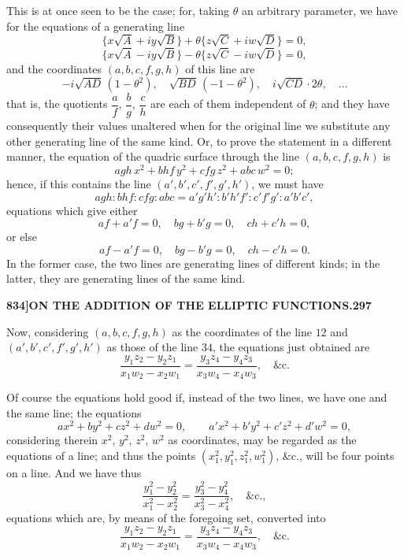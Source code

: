 \documentclass[11pt]{article}
\begin{document}
This is at once seen to be the case; for, taking $\theta$ an arbitrary parameter, we have for the equations of a generating line
\[
\{x\sqrt{A} + iy\sqrt{B}\} + \theta\{z\sqrt{C} + iw\sqrt{D}\} = 0,
\]
\[
\{x\sqrt{A} - iy\sqrt{B}\} - \theta\{z\sqrt{C} - iw\sqrt{D}\} = 0,
\]
and the coordinates $(a, b, c, f, g, h)$ of this line are
\[
-i\sqrt{AD}\,(1 - \theta^{2}),\quad \sqrt{BD}\,(-1 - \theta^{2}),\quad i\sqrt{CD}\cdot 2\theta,\quad \ldots
\]
that is, the quotients $\dfrac{a}{f}$, $\dfrac{b}{g}$, $\dfrac{c}{h}$ are each of them independent of $\theta$; and they have consequently their values unaltered when for the original line we substitute any other generating line of the same kind. Or, to prove the statement in a different manner, the equation of the quadric surface through the line $(a, b, c, f, g, h)$ is
\[
agh\,x^{2} + bhf\,y^{2} + cfg\,z^{2} + abc\,w^{2} = 0;
\]
hence, if this contains the line $(a', b', c', f', g', h')$, we must have
\[
agh : bhf : cfg : abc = a'g'h' : b'h'f' : c'f'g' : a'b'c',
\]
equations which give either
\[
af + a'f = 0,\quad bg + b'g = 0,\quad ch + c'h = 0,
\]
or else
\[
af - a'f = 0,\quad bg - b'g = 0,\quad ch - c'h = 0.
\]
In the former case, the two lines are generating lines of different kinds; in the latter, they are generating lines of the same kind.

\newpage

\noindent\textbf{834]}\hfill\textbf{ON THE ADDITION OF THE ELLIPTIC FUNCTIONS.}\hfill\textbf{297}

\bigskip

\noindent Now, considering $(a, b, c, f, g, h)$ as the coordinates of the line $12$ and $(a', b', c', f', g', h')$ as those of the line $34$, the equations just obtained are
\[
\frac{y_{1}z_{2} - y_{2}z_{1}}{x_{1}w_{2} - x_{2}w_{1}} = \frac{y_{3}z_{4} - y_{4}z_{3}}{x_{3}w_{4} - x_{4}w_{3}},\quad \&\text{c.}
\]

\medskip

Of course the equations hold good if, instead of the two lines, we have one and the same line; the equations
\[
a x^{2} + b y^{2} + c z^{2} + d w^{2} = 0,\qquad a' x^{2} + b' y^{2} + c' z^{2} + d' w^{2} = 0,
\]
considering therein $x^{2}$, $y^{2}$, $z^{2}$, $w^{2}$ as coordinates, may be regarded as the equations of a line; and thus the points $(x_{1}^{2}, y_{1}^{2}, z_{1}^{2}, w_{1}^{2})$, $\&\text{c.}$, will be four points on a line. And we have thus
\[
\frac{y_{1}^{2} - y_{2}^{2}}{x_{1}^{2} - x_{2}^{2}} = \frac{y_{3}^{2} - y_{4}^{2}}{x_{3}^{2} - x_{4}^{2}},\quad \&\text{c.},
\]
equations which are, by means of the foregoing set, converted into
\[
\frac{y_{1}z_{2} - y_{2}z_{1}}{x_{1}w_{2} - x_{2}w_{1}} = \frac{y_{3}z_{4} - y_{4}z_{3}}{x_{3}w_{4} - x_{4}w_{3}},\quad \&\text{c.}
\]
\end{document}
